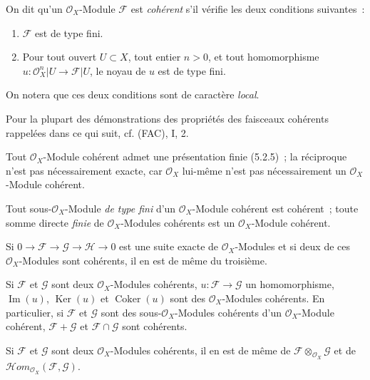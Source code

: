 \begin{env}[5.3.1]
\label{0.5.3.1-fr}
On dit qu'un $\mathcal{O}_X$-Module $\mathcal{F}$ est \emph{cohérent} s'il
vérifie les deux conditions suivantes~:
\begin{enumerate}
  \item[$a)$] $\mathcal{F}$ est de type fini.
  \item[$b)$] Pour tout ouvert $U\subset X$, tout entier $n>0$, et tout
    homomorphisme
    $u:\mathcal{O}_X^n|U\to\mathcal{F}|U$, le noyau de $u$ est de type fini.
\end{enumerate}
On notera que ces deux conditions sont de caractère \emph{local}.

Pour la plupart des démonstrations des propriétés des faisceaux cohérents
rappelées dans ce qui suit, cf. (FAC), I, 2.
\end{env}

\begin{env}[5.3.2]
\label{0.5.3.2-fr}
Tout $\mathcal{O}_X$-Module cohérent admet une présentation finie (5.2.5)~; la
réciproque n'est pas nécessairement exacte, car $\mathcal{O}_X$ lui-même n'est
pas nécessairement un $\mathcal{O}_X$-Module cohérent.

Tout sous-$\mathcal{O}_X$-Module \emph{de type fini} d'un
$\mathcal{O}_X$-Module cohérent est cohérent~; toute somme directe \emph{finie}
de $\mathcal{O}_X$-Modules cohérents est un $\mathcal{O}_X$-Module cohérent.
\end{env}

\begin{env}[5.3.3]
\label{0.5.3.3-fr}
Si $0\to\mathcal{F}\to\mathcal{G}\to\mathcal{H}\to0$ est une suite exacte de
$\mathcal{O}_X$-Modules et si deux de ces $\mathcal{O}_X$-Modules sont
cohérents, il en est de même du troisième.
\end{env}

\begin{env}[5.3.4]
\label{0.5.3.4-fr}
Si $\mathcal{F}$ et $\mathcal{G}$ sont deux $\mathcal{O}_X$-Modules cohérents,
$u:\mathcal{F}\to\mathcal{G}$ un homomorphisme, $\operatorname{Im}(u)$,
$\operatorname{Ker}(u)$ et $\operatorname{Coker}(u)$ sont des
$\mathcal{O}_X$-Modules cohérents. En particulier, si $\mathcal{F}$ et
$\mathcal{G}$ sont des sous-$\mathcal{O}_X$-Modules cohérents d'un
$\mathcal{O}_X$-Module cohérent, $\mathcal{F}+\mathcal{G}$ et
$\mathcal{F}\cap\mathcal{G}$ sont cohérents.
\end{env}

\begin{env}[5.3.5]
\label{0.5.3.5-fr}
Si $\mathcal{F}$ et $\mathcal{G}$ sont deux $\mathcal{O}_X$-Modules cohérents,
il en est de même de $\mathcal{F}\otimes_{\mathcal{O}_X}\mathcal{G}$ et de
$\mathcal{H}\!om_{\mathcal{O}_X}(\mathcal{F},\mathcal{G})$.
\end{env}


